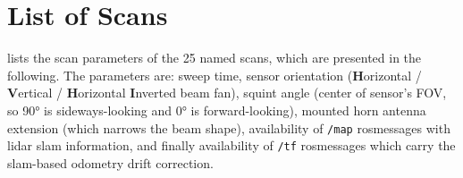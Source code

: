 \chapter{List of Scans} \label{scans}

 lists the scan parameters of the 25 named scans, which are presented in the following. The parameters are: sweep time, sensor orientation (\textbf{H}orizontal / \textbf{V}ertical / \textbf{H}orizontal \textbf{I}nverted beam fan), squint angle (center of sensor's FOV, so \ang{90} is sideways-looking and \ang{0} is forward-looking), mounted horn antenna extension (which narrows the beam shape), availability of \texttt{/map} rosmessages with lidar slam information, and finally availability of \texttt{/tf} rosmessages which carry the slam-based odometry drift correction.

